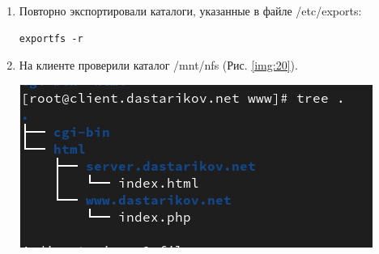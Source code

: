 \begin{enumerate}
\item Повторно экспортировали каталоги, указанные в файле /etc/exports:
    \begin{verbatim}
exportfs -r
    \end{verbatim}
\item На клиенте проверили каталог /mnt/nfs (Рис. \ref{img:20}).

\begin{center}
    \centering
    \includegraphics[width=\textwidth]{../images/image20.png}
    \label{img:20}
\end{center}

\end{enumerate}

